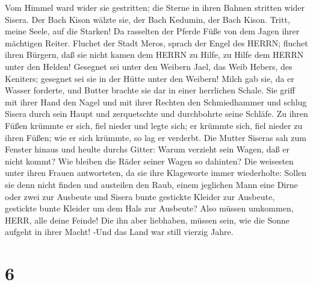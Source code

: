 Vom Himmel ward wider sie gestritten; die Sterne in ihren Bahnen
stritten wider Sisera.  Der Bach Kison wälzte sie, der Bach
Kedumin, der Bach Kison. Tritt, meine Seele, auf die Starken!
 Da rasselten der Pferde Füße von dem Jagen ihrer mächtigen
Reiter.  Fluchet der Stadt Meros, sprach der Engel des
HERRN; fluchet ihren Bürgern, daß sie nicht kamen dem HERRN zu Hilfe, zu
Hilfe dem HERRN unter den Helden!  Gesegnet sei unter den
Weibern Jael, das Weib Hebers, des Keniters; gesegnet sei sie in der
Hütte unter den Weibern!  Milch gab sie, da er Wasser
forderte, und Butter brachte sie dar in einer herrlichen Schale.
 Sie griff mit ihrer Hand den Nagel und mit ihrer Rechten
den Schmiedhammer und schlug Sisera durch sein Haupt und zerquetschte
und durchbohrte seine Schläfe.  Zu ihren Füßen krümmte er
sich, fiel nieder und legte sich; er krümmte sich, fiel nieder zu ihren
Füßen; wie er sich krümmte, so lag er verderbt.  Die Mutter
Siseras sah zum Fenster hinaus und heulte durchs Gitter: Warum verzieht
sein Wagen, daß er nicht kommt? Wie bleiben die Räder seiner Wagen so
dahinten?  Die weisesten unter ihren Frauen antworteten, da
sie ihre Klageworte immer wiederholte:  Sollen sie denn
nicht finden und austeilen den Raub, einem jeglichen Mann eine Dirne
oder zwei zur Ausbeute und Sisera bunte gestickte Kleider zur Ausbeute,
gestickte bunte Kleider um dem Hals zur Ausbeute?  Also
müssen umkommen, HERR, alle deine Feinde! Die ihn aber liebhaben, müssen
sein, wie die Sonne aufgeht in ihrer Macht! -Und das Land war still
vierzig Jahre.

\hypertarget{section-5}{%
\section{6}\label{section-5}}

